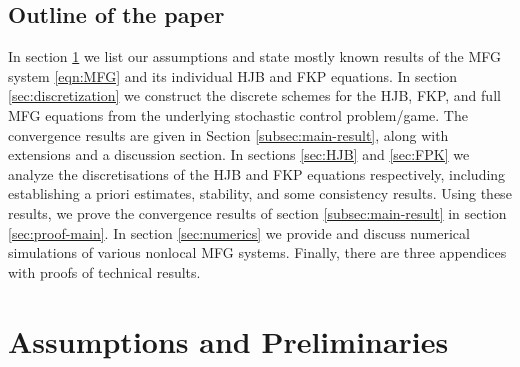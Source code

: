 \documentclass[a4paper,  twoside, 10pt, leqno]{amsart}
\theoremstyle{remark}
\theoremstyle{definition}
\begin{document}
\subsection*{Outline of the paper} 
In section \ref{sec:prelim} we list our assumptions and state mostly known
results of the MFG system \eqref{eqn:MFG} and its individual HJB and FKP
equations. 
In section \ref{sec:discretization} we construct  the discrete schemes
for the HJB,  FKP, and full MFG equations from the underlying stochastic
control problem/game. The convergence results are given in Section
\ref{subsec:main-result}, along with extensions and a discussion
section.
In sections \ref{sec:HJB} and \ref{sec:FPK} we analyze the
discretisations of the HJB and FKP equations respectively, including
establishing a priori estimates, stability, and some consistency results.
Using these results, we prove the convergence results of section
\ref{subsec:main-result} in section \ref{sec:proof-main}.
In section \ref{sec:numerics} we provide and discuss numerical
simulations of various nonlocal MFG systems. Finally, there are three
appendices with proofs of technical results.



 \section{Assumptions and Preliminaries} \label{sec:prelim} 
\end{document}
